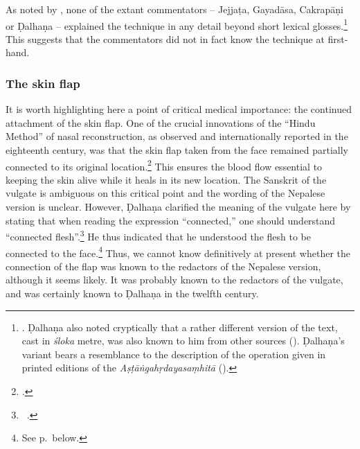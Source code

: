 As noted by \citeauthor{meul-hist}, none of the extant commentators -- Jejjaṭa,
Gayadāsa, Cakrapāṇi or Ḍalhaṇa -- explained the technique in any detail beyond short
lexical glosses.\footnote{\cite[IB, 328]{meul-hist}. Ḍalhaṇa also noted
cryptically that a rather different version of the text, cast in \emph{śloka}
metre, was also known to him from other sources (). 
Ḍalhaṇa's variant bears a resemblance to the description of the operation given in
printed editions of the \emph{Aṣṭāṅgahṛdayasaṃhitā} 
().}
This suggests that the commentators did not in fact know the technique at
first-hand.

\subsubsection{The skin flap} 
\label{skinflap}
It is worth highlighting here a point of critical
medical importance: the continued attachment of the skin flap. One of the crucial
innovations of the “Hindu Method” of nasal reconstruction, as observed  and
internationally reported in the eighteenth century, was that the skin flap taken
from the face remained partially connected to its original
location.\footcite[See][67--70]{wuja-2003} This ensures the blood flow essential
to keeping the skin alive while it heals in its new location.  The Sanskrit of the
vulgate is ambiguous on this critical point and the wording of the Nepalese
version is unclear. However, Ḍalhaṇa clarified the meaning of the vulgate here by
stating that when reading the expression “connected,” one should understand
“connected flesh”.\footnote{\SS\ .}  He thus indicated that he
    understood the flesh to be connected to the face.\footnote{See
        p.\,\pageref{well-joined} below.}  Thus, we cannot know definitively at present
        whether the connection of the flap was known to the redactors of the Nepalese
        version, although it seems likely.  It was probably known to the redactors of the
        vulgate, and was certainly known to Ḍalhaṇa in the twelfth century.
        

